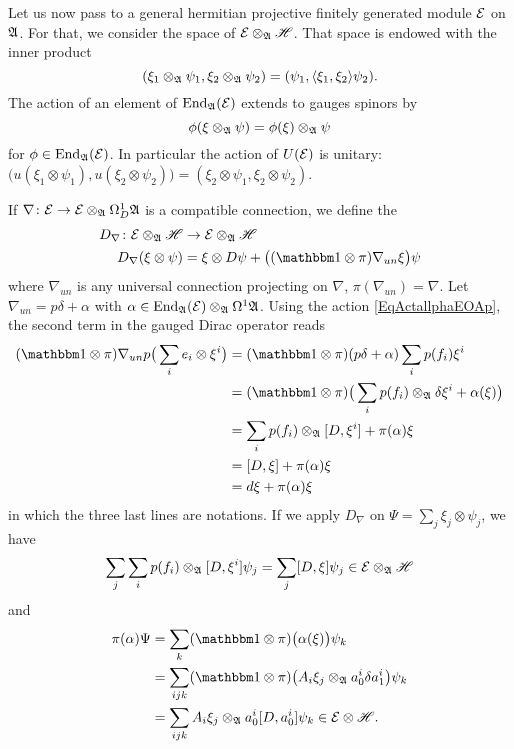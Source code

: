 Let us now pass to a general hermitian projective finitely generated module $\mathcal{E}$ on $\mathfrak{A}$. For that, we consider the space of  $\mathcal{E}\otimes_{\mathfrak{A}}\mathscr{H}$. That space is endowed with the inner product
\begin{equation}
( \xi_1\otimes_{\mathfrak{A}}\psi_1,\xi_2\otimes_{\mathfrak{A}}\psi_2  )=(\psi_1,\langle \xi_1, \xi_2\rangle \psi_2).
\end{equation}
The action of an element of $\operatorname{End}_{\mathfrak{A}}(\mathcal{E})$ extends to gauges spinors by
\[ 
  \phi(\xi\otimes_{\mathfrak{A}}\psi)=\phi(\xi)\otimes_{\mathfrak{A}}\psi
\]
for $\phi\in\operatorname{End}_{\mathfrak{A}}(\mathcal{E})$. In particular the action of $U(\mathcal{E})$ is unitary: $\big( u(\xi_1\otimes\psi_1),u(\xi_2\otimes\psi_2) \big)=(\xi_2\otimes\psi_1,\xi_2\otimes\psi_2)$.

If $\nabla\colon \mathcal{E}\to \mathcal{E}\otimes_{\mathfrak{A}}\Omega^1_D\mathfrak{A}$ is a compatible connection, we define the 
\begin{equation}
\begin{aligned}
 D_{\nabla}\colon \modE\otimes_{\cA}\hH&\to \modE\otimes_{\cA}\hH \\ 
   D_{\nabla}(\xi\otimes\psi)&=	\xi\otimes D\psi+\big( (\mtu\otimes\pi)\nabla_{un}\xi \big)\psi 
\end{aligned}
\end{equation}
where $\nabla_{un}$ is any universal connection projecting on $\nabla$, $\pi(\nabla_{un})=\nabla$. Let $\nabla_{un}=p\delta+\alpha$ with $\alpha\in\operatorname{End}_{\mathfrak{A}}(\mathcal{E})\otimes_{\mathfrak{A}}\Omega^1\mathfrak{A}$. Using the action \eqref{EqActallphaEOAp}, the second term in the gauged Dirac operator reads
\begin{align*}
(\mtu\otimes\pi)\nabla_{un}p\big(  \sum_ie_i\otimes\xi^i \big)&=(\mtu\otimes\pi)(p\delta+\alpha)\sum_ip(f_i)\xi^i\\
		&=(\mtu\otimes\pi)\big( \sum_ip(f_i) \otimes_{\cA} \delta \xi^i +\alpha(\xi) \big)\\
		&=\sum_ip(f_i)\otimes_{\cA}[D,\xi^i]+\pi(\alpha)\xi\\
		&=[D,\xi]+\pi(\alpha)\xi\\
		&=d\xi+\pi(\alpha)\xi
\end{align*}
in which the three last lines are notations. If we apply $D_{\nabla}$ on $\Psi=\sum_j\xi_j\otimes\psi_j$, we have
\[ 
  \sum_j\sum_ip(f_i)\otimes_{\mathfrak{A}}[D,\xi^i]\psi_j=\sum_j[D,\xi]\psi_j\in\mathcal{E}\otimes_{\mathfrak{A}}\mathscr{H}
\]
and
\begin{align*}
\pi(\alpha)\Psi&=\sum_k(\mtu\otimes\pi)\big( \alpha(\xi) \big)\psi_k\\
		&=\sum_{ijk}(\mtu\otimes\pi)\big( A_i\xi_j\otimes_{\cA}a^i_0\delta a^i_1 \big)\psi_k\\
		&=\sum_{ijk}A_i\xi_j\otimes_{\cA}a^i_0[D,a^i_0]\psi_k\in\modE\otimes\hH.
\end{align*}
